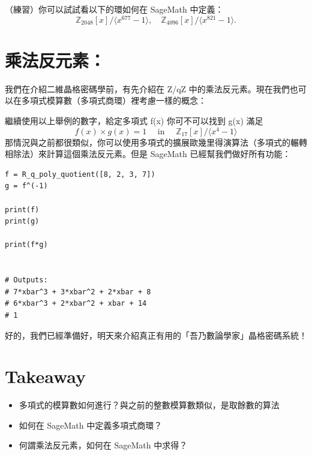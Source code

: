 \documentclass[
]{article}
\providecommand{\tightlist}{%
  \setlength{\itemsep}{0pt}\setlength{\parskip}{0pt}}
\begin{document}
（練習）你可以試試看以下的環如何在 SageMath 中定義： \[
\mathbb{Z}_{2048}[x] / \langle x^{677}-1\rangle,\quad
\mathbb{Z}_{4096}[x] / \langle x^{821}-1\rangle.
\]

\hypertarget{ux4e58ux6cd5ux53cdux5143ux7d20}{%
\section{乘法反元素：}\label{ux4e58ux6cd5ux53cdux5143ux7d20}}

我們在介紹二維晶格密碼學前，有先介紹在 Z/qZ
中的乘法反元素。現在我們也可以在多項式模算數（多項式商環）裡考慮一樣的概念：

繼續使用以上舉例的數字，給定多項式 f(x) 你可不可以找到 g(x) 滿足 \[
f(x) \times g(x) =1  \quad \text{ in }\quad  \mathbb{Z}_{17}[x] /\langle x^4-1 \rangle
\]
那情況與之前都很類似，你可以使用多項式的擴展歐幾里得演算法（多項式的輾轉相除法）來計算這個乘法反元素。但是
SageMath 已經幫我們做好所有功能：

\begin{verbatim}
f = R_q_poly_quotient([8, 2, 3, 7])
g = f^(-1)

print(f)
print(g)

print(f*g)


# Outputs:
# 7*xbar^3 + 3*xbar^2 + 2*xbar + 8
# 6*xbar^3 + 2*xbar^2 + xbar + 14
# 1
\end{verbatim}

好的，我們已經準備好，明天來介紹真正有用的「吾乃數論學家」晶格密碼系統！

\hypertarget{takeaway}{%
\section{Takeaway}\label{takeaway}}

\begin{itemize}
\tightlist
\item
  多項式的模算數如何進行？與之前的整數模算數類似，是取餘數的算法
\item
  如何在 SageMath 中定義多項式商環？
\item
  何謂乘法反元素，如何在 SageMath 中求得？
\end{itemize}
\end{document}
